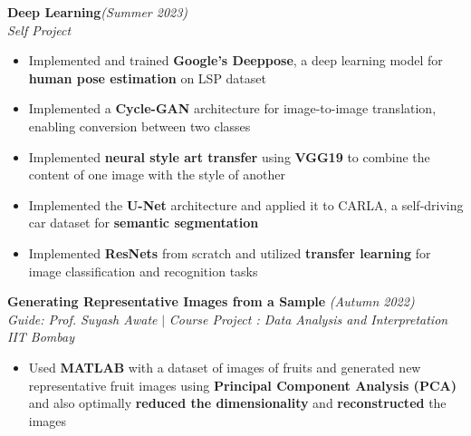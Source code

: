 \documentclass[a4paper,10pt]{article}
\begin{document}
\vspace{\baselineskip}
\vspace{-20pt}
\noindent\textbf{\large Deep Learning}\hfill{\sl \small (Summer 2023)}\\
{\it Self Project}
\\\vspace{-13pt}
\begin{itemize}[itemsep = -0.65 mm, leftmargin=*]
    \item Implemented and trained \textbf{Google's Deeppose}, a deep learning model for \textbf{human pose estimation} on LSP dataset
    \item Implemented a \textbf{Cycle-GAN} architecture for image-to-image translation, enabling conversion between two classes 
    \item Implemented \textbf{neural style art transfer} using \textbf{VGG19} to combine the content of one image with the style of another
    \item Implemented the \textbf{U-Net} architecture and applied it to CARLA, a self-driving car dataset for \textbf{semantic segmentation}
    \item Implemented \textbf{ResNets} from scratch and utilized \textbf{transfer learning} for image classification and recognition tasks
\end{itemize}

\vspace{\baselineskip}
\vspace{-13pt}
\noindent\textbf{\large Generating Representative Images from a Sample} \hfill{\sl \small (Autumn 2022)}\\
{\it Guide: Prof. Suyash Awate} $|$ {\it Course Project : Data Analysis and Interpretation } \hfill{\it IIT Bombay}
\vspace{-2pt}
\begin{itemize}[itemsep = -0.65 mm, leftmargin=*]
    \item Used \textbf{MATLAB} with a dataset of images of fruits and generated new
          representative fruit images using \textbf{Principal Component Analysis (PCA)} and also optimally \textbf{reduced the
              dimensionality} and \textbf{reconstructed} the images
\end{itemize}
\end{document}
